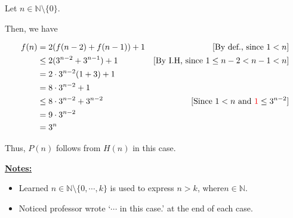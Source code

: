 \documentclass[12pt]{article}
\begin{document}
\begin{mdframed}
    \bigskip

    Let $n \in \mathbb{N} \setminus \{0\}$.

    \bigskip

    Then, we have

    \begin{align}
        f(n) &= 2(f(n-2) + f(n-1)) + 1 & [\text{By def., since $1 < n$}]\\
        &\leq 2(3^{n-2} + 3^{n-1}) + 1 & [\text{By I.H, since $1 \leq n-2 < n-1 < n$}]\\
        &= 2 \cdot 3^{n-2}(1 + 3) + 1\\
        &= 8 \cdot 3^{n-2} + 1 \\
        &\leq 8 \cdot 3^{n-2} + 3^{n-2} & [\text{Since $1 < n$ and $\color{red}1\color{black} \leq 3^{n-2}$}]\\
        &= 9 \cdot 3^{n-2}\\
        &= 3^n
    \end{align}

    \bigskip

    Thus, $P(n)$ follows \color{red}from $H(n)$ in this case\color{black}.

\end{mdframed}

\bigskip

\underline{\textbf{Notes:}}

\bigskip

\begin{itemize}
    \item Learned $n \in \mathbb{N} \setminus \{0,\cdots,k\}$ is used to express
    $n > k$, where$n \in \mathbb{N}$.
    \item Noticed professor wrote `$\cdots$ in this case.' at the end of each case.
\end{itemize}







\end{document}
